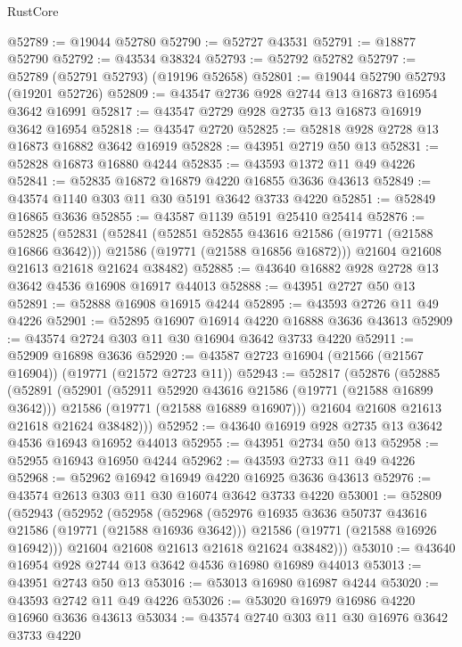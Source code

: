 \begin{lexlean}{RustCore}
\begin{coremodule}
@52789 := @19044 @52780
@52790 := @52727 @43531
@52791 := @18877 @52790
@52792 := @43534 @38324
@52793 := @52792 @52782
@52797 := @52789 (@52791 @52793) (@19196 @52658)
@52801 := @19044 @52790 @52793 (@19201 @52726)
@52809 := @43547 @2736 @928 @2744 @13 @16873 @16954 @3642 @16991
@52817 := @43547 @2729 @928 @2735 @13 @16873 @16919 @3642 @16954
@52818 := @43547 @2720
@52825 := @52818 @928 @2728 @13 @16873 @16882 @3642 @16919
@52828 := @43951 @2719 @50 @13
@52831 := @52828 @16873 @16880 @4244
@52835 := @43593 @1372 @11 @49 @4226
@52841 := @52835 @16872 @16879 @4220 @16855 @3636 @43613
@52849 := @43574 @1140 @303 @11 @30 @5191 @3642 @3733 @4220
@52851 := @52849 @16865 @3636
@52855 := @43587 @1139 @5191 @25410 @25414
@52876 := @52825
    (@52831
      (@52841
        (@52851 @52855 @43616 @21586 (@19771 (@21588 @16866 @3642)))
        @21586
        (@19771 (@21588 @16856 @16872)))
      @21604
      @21608
      @21613
      @21618
      @21624
      @38482)
@52885 := @43640 @16882 @928 @2728 @13 @3642 @4536 @16908 @16917 @44013
@52888 := @43951 @2727 @50 @13
@52891 := @52888 @16908 @16915 @4244
@52895 := @43593 @2726 @11 @49 @4226
@52901 := @52895 @16907 @16914 @4220 @16888 @3636 @43613
@52909 := @43574 @2724 @303 @11 @30 @16904 @3642 @3733 @4220
@52911 := @52909 @16898 @3636
@52920 := @43587 @2723 @16904 (@21566 (@21567 @16904)) (@19771 (@21572 @2723 @11))
@52943 := @52817
    (@52876
      (@52885
        (@52891
          (@52901
            (@52911 @52920 @43616 @21586 (@19771 (@21588 @16899 @3642)))
            @21586
            (@19771 (@21588 @16889 @16907)))
          @21604
          @21608
          @21613
          @21618
          @21624
          @38482)))
@52952 := @43640 @16919 @928 @2735 @13 @3642 @4536 @16943 @16952 @44013
@52955 := @43951 @2734 @50 @13
@52958 := @52955 @16943 @16950 @4244
@52962 := @43593 @2733 @11 @49 @4226
@52968 := @52962 @16942 @16949 @4220 @16925 @3636 @43613
@52976 := @43574 @2613 @303 @11 @30 @16074 @3642 @3733 @4220
@53001 := @52809
    (@52943
      (@52952
        (@52958
          (@52968
            (@52976 @16935 @3636 @50737 @43616 @21586 (@19771 (@21588 @16936 @3642)))
            @21586
            (@19771 (@21588 @16926 @16942)))
          @21604
          @21608
          @21613
          @21618
          @21624
          @38482)))
@53010 := @43640 @16954 @928 @2744 @13 @3642 @4536 @16980 @16989 @44013
@53013 := @43951 @2743 @50 @13
@53016 := @53013 @16980 @16987 @4244
@53020 := @43593 @2742 @11 @49 @4226
@53026 := @53020 @16979 @16986 @4220 @16960 @3636 @43613
@53034 := @43574 @2740 @303 @11 @30 @16976 @3642 @3733 @4220

\end{coremodule}
\end{lexlean}
